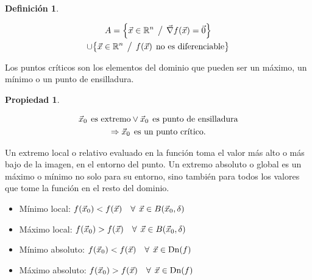 \documentclass[a5paper,12pt,twoside]{book}
\newtheorem{defn}{{Definición}}[chapter]
\newtheorem{prop}{{Propiedad}}[chapter]
\begin{document}
\begin{mdframed}[style=MyFrame1]
    \begin{defn}
    \end{defn}
    \begin{multline*}
        A = { \left\{ { \Vec{x} \in \mathbb{R}^n \hspace{1ex} \big/ \hspace{1ex} \Vec{\nabla} f(\Vec{x}) = \Vec{0} } \right\} }
        \\
        \cup { \left\{ { \Vec{x} \in \mathbb{R}^n\hspace{1ex} \big/ \hspace{1ex}f(\Vec{x}) \hspace{1ex} \textrm{no es diferenciable} } \right\} }
    \end{multline*}
\end{mdframed}

Los puntos críticos son los elementos del dominio que pueden ser un máximo, un mínimo o un punto de ensilladura.

\begin{mdframed}[style=MyFrame1]
    \begin{prop}
    \end{prop}
    \begin{gather*}
        \Vec{x}_0 \hspace{1ex} \textrm{es extremo} \lor \Vec{x}_0 \hspace{1ex} \textrm{es punto de ensilladura}
        \\
        \Rightarrow \Vec{x}_0 \hspace{1ex} \textrm{es un punto crítico.}
    \end{gather*}
\end{mdframed}

Un extremo local o relativo evaluado en la función toma el valor más alto o más bajo de la imagen, en el entorno del punto. Un extremo absoluto o global es un máximo o mínimo no solo para su entorno, sino también para todos los valores que tome la función en el resto del dominio.

\begin{itemize}
    \item Mínimo local: $f(\Vec{x}_0)<f(\Vec{x}) \quad \forall \hspace{1ex} \Vec{x} \in B(\Vec{x}_0, \delta)$

    \item Máximo local: $f(\Vec{x}_0)>f(\Vec{x}) \quad \forall \hspace{1ex} \Vec{x} \in B(\Vec{x}_0, \delta)$

    \item Mínimo absoluto: $f(\Vec{x}_0)<f(\Vec{x}) \quad \forall \hspace{1ex} \Vec{x} \in \operatorname{Dn}(f)$

    \item Máximo absoluto: $f(\Vec{x}_0)>f(\Vec{x}) \quad \forall \hspace{1ex} \Vec{x} \in \operatorname{Dn}(f)$
\end{itemize}
\end{document}
